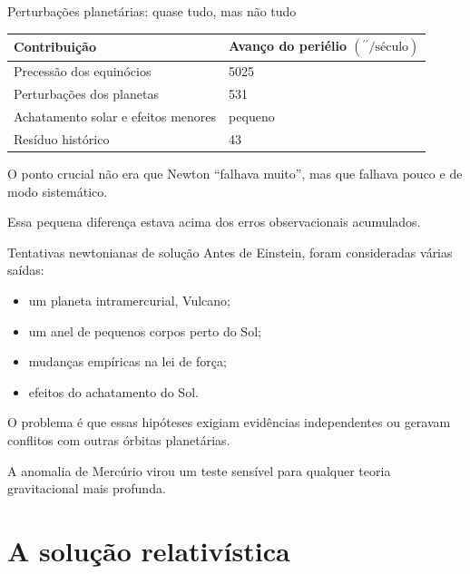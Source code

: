 \documentclass[aspectratio=169,10pt]{beamer}
\newcommand{\arcsec}{^{\prime\prime}}
\begin{document}
\begin{frame}{Perturbações planetárias: quase tudo, mas não tudo}
  \begin{table}
    \centering
    \begin{tabular}{ll}
      \toprule
      Contribuição & {Avanço do periélio $(\arcsec/\text{século})$} \\
      \midrule
      Precessão dos equinócios & 5025 \\
      Perturbações dos planetas & 531 \\
      Achatamento solar e efeitos menores & pequeno \\
      \midrule
      Resíduo histórico & 43 \\
      \bottomrule
    \end{tabular}
  \end{table}

  \vspace{0.25cm}
  O ponto crucial não era que Newton ``falhava muito'', mas que falhava pouco e de modo sistemático.

  \vspace{0.2cm}
  Essa pequena diferença estava acima dos erros observacionais acumulados.
\end{frame}

\begin{frame}{Tentativas newtonianas de solução}
  Antes de Einstein, foram consideradas várias saídas:

  \begin{itemize}
    \item um planeta intramercurial, Vulcano;
    \item um anel de pequenos corpos perto do Sol;
    \item mudanças empíricas na lei de força;
    \item efeitos do achatamento do Sol.
  \end{itemize}

  \vspace{0.35cm}
  O problema é que essas hipóteses exigiam evidências independentes ou geravam conflitos com outras órbitas planetárias.

  \vspace{0.35cm}
  A anomalia de Mercúrio virou um teste sensível para qualquer teoria gravitacional mais profunda.
\end{frame}

\section{A solução relativística}
\end{document}
